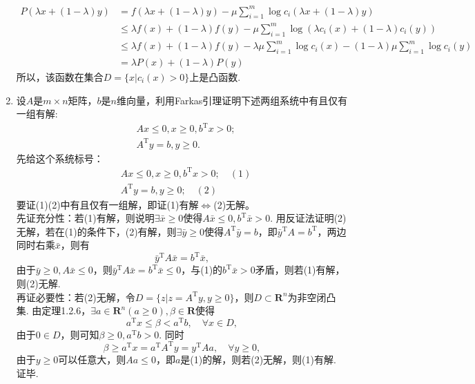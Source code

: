 \begin{enumerate}
    \begin{align*}
        P(\lambda x+(1-\lambda)y) & = f(\lambda x+(1-\lambda)y)-\mu\sum\limits_{i=1}^m \log c_i(\lambda x+(1-\lambda)y)\\
        & \leqslant \lambda f(x) + (1-\lambda) f(y) - \mu\sum\limits_{i=1}^m \log (\lambda c_i(x)+(1-\lambda)c_i(y))\\
        & \leqslant \lambda f(x) + (1-\lambda) f(y) - \lambda\mu\sum\limits_{i=1}^m \log c_i(x)-(1-\lambda)\mu\sum\limits_{i=1}^m \log c_i(y)\\
        & = \lambda P(x) + (1-\lambda) P(y)
    \end{align*}
    所以，该函数在集合$D=\{x | c_i(x) > 0\}$上是凸函数.
    \item 设$A$是$m \times n$矩阵，$b$是$n$维向量，利用Farkas引理证明下述两组系统中有且仅有一组有解: \begin{align*}
        &Ax \leqslant 0, x \geqslant 0, b^{\mathrm{T}}x > 0;\\
        &A^{\mathrm{T}}y=b,y \geqslant 0.
    \end{align*}
    \pro 先给这个系统标号：
    \begin{align*}
        &Ax \leqslant 0, x \geqslant 0, b^{\mathrm{T}}x > 0; \quad (1)\\
        &A^{\mathrm{T}}y=b,y \geqslant 0; \quad (2)
    \end{align*}
    要证(1)(2)中有且仅有一组解，即证(1)有解$\iff$(2)无解。\\
    先证充分性：若(1)有解，则说明$\exists \bar{x} \geqslant 0$使得$A\bar{x} \leqslant 0,b^{\mathrm{T}} \bar{x}>0$. 用反证法证明(2)无解，若在(1)的条件下，(2)有解，则$\exists \bar{y} \geqslant 0$使得$A^{\mathrm{T}}\bar{y}=b$，即$\bar{y}^{\mathrm{T}}A=b^{\mathrm{T}}$，两边同时右乘$\bar{x}$，则有
    \[\bar{y}^{\mathrm{T}}A\bar{x}=b^{\mathrm{T}}\bar{x},\]
    由于$\bar{y} \geqslant 0, A\bar{x} \leqslant 0$，则$\bar{y}^{\mathrm{T}}A\bar{x} = b^{\mathrm{T}}\bar{x} \leqslant 0$，与(1)的$b^{\mathrm{T}} \bar{x}>0$矛盾，则若(1)有解，则(2)无解.\\
    再证必要性：若(2)无解，令$D=\{z | z=A^{\mathrm{T}}y, y \geqslant 0\}$，则$D \subset \textbf{R}^n$为非空闭凸集. 由定理1.2.6，$\exists a \in \textbf{R}^n(a \geqslant 0),\beta \in \textbf{R}$使得\[a^{\mathrm{T}}x \leqslant \beta < a^{\mathrm{T}}b,\quad \forall x \in D,\]
    由于$0 \in D$，则可知$\beta \geqslant 0, a^{\mathrm{T}}b > 0$. 同时\[\beta \geqslant a^{\mathrm{T}}x = a^{\mathrm{T}}A^{\mathrm{T}}y=y^{\mathrm{T}}Aa, \quad \forall y \geqslant 0,\]
    由于$y \geqslant 0$可以任意大，则$Aa \leqslant 0$，即$a$是(1)的解，则若(2)无解，则(1)有解. 证毕.

\end{enumerate}
